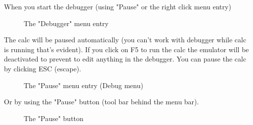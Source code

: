 \documentclass[10pt]{report}
\begin{document}
When you start the debugger (using "Pause" or the right click menu entry) 
\begin{figure}[H]
\centering
{}
\caption{The "Debugger" menu entry}
\end{figure}

The calc will be paused automatically (you can't work with debugger while calc is running that's evident).\newline
If you click on F5 to run the calc the emulator will be deactivated to prevent to edit anything in the debugger.\newline
You can pause the calc by clicking ESC (escape).\newline
\begin{figure}[H]
\centering
{}
\caption{The "Pause" menu entry (Debug menu)}
\end{figure}

Or by using the "Pause" button (tool bar behind the menu bar).\newline
\begin{figure}[H]
\centering
{}
\caption{The "Pause" button}
\end{figure}
\end{document}
